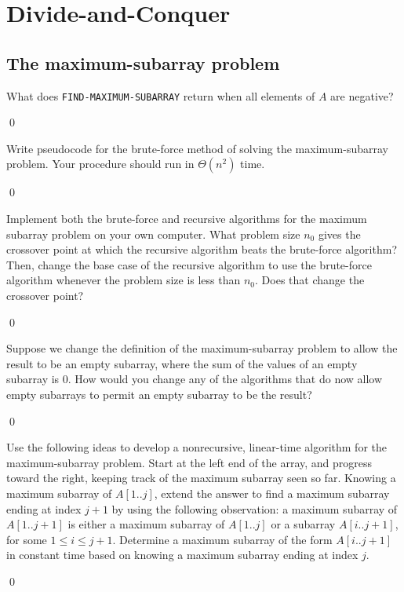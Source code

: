 \chapter{Divide-and-Conquer}
\section{The maximum-subarray problem}

 What does \verb|FIND-MAXIMUM-SUBARRAY| return when all elements of $A$ are negative?

\sol \qed

 Write pseudocode for the brute-force method of solving the maximum-subarray problem. Your procedure should run in $\Theta(n^2)$ time.

\sol \qed

 Implement both the brute-force and recursive algorithms for the maximum subarray problem on your own computer. What problem size $n_0$ gives the crossover point at which the recursive algorithm beats the brute-force algorithm? Then, change the base case of the recursive algorithm to use the brute-force algorithm whenever the problem size is less than $n_0$. Does that change the crossover point?

\sol \qed

 Suppose we change the definition of the maximum-subarray problem to allow the result to be an empty subarray, where the sum of the values of an empty subarray is 0. How would you change any of the algorithms that do now allow empty subarrays to permit an empty subarray to be the result?

\sol \qed

 Use the following ideas to develop a nonrecursive, linear-time algorithm for the maximum-subarray problem. Start at the left end of the array, and progress toward the right, keeping track of the maximum subarray seen so far. Knowing a maximum subarray of $A[1..j]$, extend the answer to find a maximum subarray ending at index $j+1$ by using the following observation: a maximum subarray of $A[1..j+1]$ is either a maximum subarray of $A[1..j]$ or a subarray $A[i..j+1]$, for some $1 \leq i \leq j+1$. Determine a maximum subarray of the form $A[i..j+1]$ in constant time based on knowing a maximum subarray ending at index $j$.

\sol \qed